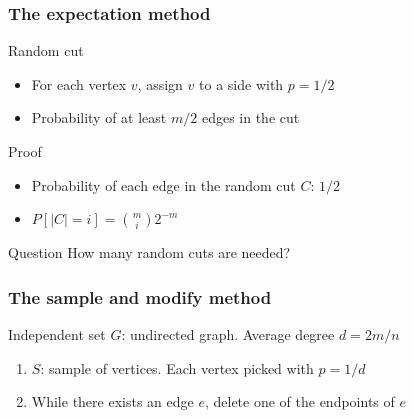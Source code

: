 \documentclass[12pt,aspectratio=169]{beamer}
\begin{document}
\begin{frame}[fragile]
\frametitle{The expectation method}
\begin{block}{Random cut}
  \begin{itemize}
    \item
      For each vertex $v$, assign $v$ to a side with $p=1/2$
    \item
      Probability of at least $m/2$ edges in the cut
    \end{itemize}
  \end{block}

  \begin{block}{Proof}
  \begin{itemize}
    \item
      Probability of each edge in the random cut $C$: $1/2$
    \item
      $P[|C|=i] = {m \choose i}2^{-m}$
    \end{itemize}
  \end{block}

  \begin{block}{Question}
    How many random cuts are needed?
  \end{block}
\end{frame}

\begin{frame}[fragile]
\frametitle{The sample and modify method}
  \begin{block}{Independent set}
    $G$: undirected graph.
%
    Average degree $d=2m/n$
    \begin{enumerate}
    \item
      $S$: sample of vertices.
%
      Each vertex picked with $p=1/d$
    \item
      While there exists an edge $e$, delete one of the endpoints of $e$
    \end{enumerate}
  \end{block}
\end{frame}
\end{document}
